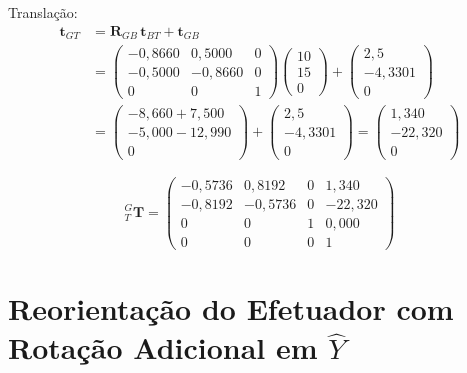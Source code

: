 \documentclass[12pt,a4paper]{article}
\newcommand{\Trans}[2]{{}^{#1}_{#2}\!\mathbf{T}}
\begin{document}
Translação:
\begin{align*}
  \mathbf{t}_{GT} &= \mathbf{R}_{GB}\,\mathbf{t}_{BT} + \mathbf{t}_{GB} \\
  &= \begin{pmatrix}-0{,}8660&0{,}5000&0\\-0{,}5000&-0{,}8660&0\\0&0&1\end{pmatrix}
     \begin{pmatrix}10\\15\\0\end{pmatrix}
  + \begin{pmatrix}2{,}5\\-4{,}3301\\0\end{pmatrix} \\
  &= \begin{pmatrix}-8{,}660+7{,}500\\-5{,}000-12{,}990\\0\end{pmatrix}
  + \begin{pmatrix}2{,}5\\-4{,}3301\\0\end{pmatrix}
  = \begin{pmatrix}1{,}340\\-22{,}320\\0\end{pmatrix}
\end{align*}

\begin{tcolorbox}[resultbox]
\[
\Trans{G}{T} =
\begin{pmatrix}
 -0{,}5736 &  0{,}8192 & 0 &   1{,}340 \\
 -0{,}8192 & -0{,}5736 & 0 & -22{,}320 \\
  0        &  0        & 1 &   0{,}000 \\
  0        &  0        & 0 &   1
\end{pmatrix}
\]
\end{tcolorbox}

\newpage

\section{Reorientação do Efetuador com Rotação Adicional em $\hat{Y}$}
\end{document}
